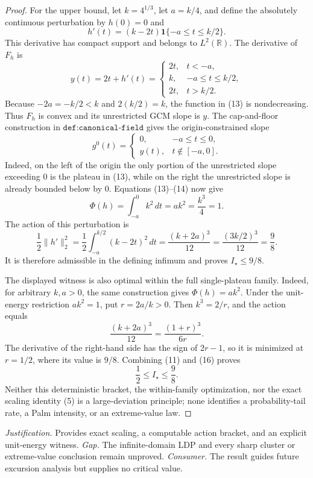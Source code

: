 \documentclass{article}
\begin{document}
\begin{proof}
For the upper bound, let \(k=4^{1/3}\), let \(a=k/4\), and define the absolutely continuous perturbation by \(h(0)=0\) and
\[
 h'(t)=(k-2t)\mathbf 1\{-a\le t\le k/2\}. \tag{12}
\]
This derivative has compact support and belongs to \(L^2(\mathbb R)\).  The derivative of \(F_h\) is
\[
 y(t)=2t+h'(t)=
 \begin{cases}
 2t,&t<-a,\\
 k,&-a\le t\le k/2,\\
 2t,&t>k/2.
 \end{cases} \tag{13}
\]
Because \(-2a=-k/2<k\) and \(2(k/2)=k\), the function in (13) is nondecreasing.  Thus \(F_h\) is convex and its unrestricted GCM slope is \(y\).  The cap-and-floor construction in \(\texttt{def:canonical-field}\) gives the origin-constrained slope
\[
 g^0(t)=
 \begin{cases}
 0,&-a\le t\le0,\\
 y(t),&t\notin[-a,0].
 \end{cases} \tag{14}
\]
Indeed, on the left of the origin the only portion of the unrestricted slope exceeding \(0\) is the plateau in (13), while on the right the unrestricted slope is already bounded below by \(0\).  Equations (13)--(14) now give
\[
 \Phi(h)=\int_{-a}^{0}k^2\,dt=ak^2=\frac{k^3}{4}=1. \tag{15}
\]
The action of this perturbation is
\[
 \frac12\lVert h'\rVert_2^2
 =\frac12\int_{-a}^{k/2}(k-2t)^2\,dt
 =\frac{(k+2a)^3}{12}
 =\frac{(3k/2)^3}{12}
 =\frac98. \tag{16}
\]
It is therefore admissible in the defining infimum and proves \(I_\star\le9/8\).

The displayed witness is also optimal within the full single-plateau family.  Indeed, for arbitrary \(k,a>0\), the same construction gives \(\Phi(h)=ak^2\).  Under the unit-energy restriction \(ak^2=1\), put \(r=2a/k>0\).  Then \(k^3=2/r\), and the action equals
\[
 \frac{(k+2a)^3}{12}=\frac{(1+r)^3}{6r}. \tag{17}
\]
The derivative of the right-hand side has the sign of \(2r-1\), so it is minimized at \(r=1/2\), where its value is \(9/8\).  Combining (11) and (16) proves
\[
 \frac12\le I_\star\le\frac98.
\]
Neither this deterministic bracket, the within-family optimization, nor the exact scaling identity (5) is a large-deviation principle; none identifies a probability-tail rate, a Palm intensity, or an extreme-value law.
\end{proof}
\par\smallskip\noindent \textit{Justification.} Provides exact scaling, a computable action bracket, and an explicit unit-energy witness. \textit{Gap.} The infinite-domain LDP and every sharp cluster or extreme-value conclusion remain unproved. \textit{Consumer.} The result guides future excursion analysis but supplies no critical value.
\end{document}
